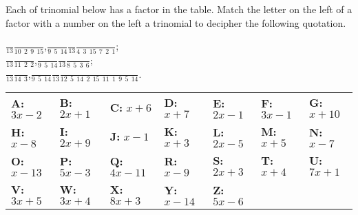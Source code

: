 \begin{exercise}
  Each of trinomial below has a factor in the table. Match the letter on
  the left of a factor with a number on the left a trinomial to
  decipher the following quotation.
  
\vspace*{\baselineskip}

\(\frac{\phantom{A}}{13}\)\quad \(\frac{\phantom{A}}{10~~2~~9~~15}\),\quad \(\frac{\phantom{A}}{9~~5~~14}\)\quad \(\frac{\phantom{A}}{13}\)\quad \(\frac{\phantom{A}}{4~~3~~15~~7~~2~~1}\);\\

\(\frac{\phantom{A}}{13}\)\quad \(\frac{\phantom{A}}{11~~2~~2}\),\quad \(\frac{\phantom{A}}{9~~5~~14}\)\quad \(\frac{\phantom{A}}{13}\)\quad \(\frac{\phantom{A}}{8~~5~~3~~6}\);\\

\(\frac{\phantom{A}}{13}\)\quad \(\frac{\phantom{A}}{14~~3}\),\quad \(\frac{\phantom{A}}{9~~5~~14}\)\quad \(\frac{\phantom{A}}{13}\)\quad \(\frac{\phantom{A}}{12~~5~~14~~2~~15~~11~~1~~9~~5~~14}\).
  
  \begin{longtable}[]{@{}
    >{\raggedright\arraybackslash}p{}
    >{\raggedright\arraybackslash}p{}
    >{\raggedright\arraybackslash}p{}
    >{\raggedright\arraybackslash}p{}
    >{\raggedright\arraybackslash}p{}
    >{\raggedright\arraybackslash}p{}
    >{\raggedright\arraybackslash}p{}@{}}
  \toprule()
  \endhead
  \textbf{A:} \(3x-2\) & \textbf{B:} \(2x+1\) & \textbf{C:} \(x+6\) &
  \textbf{D:} \(x+7\) & \textbf{E:} \(2x-1\) & \textbf{F:} \(3x-1\) &
  \textbf{G:} \(x+10\) \\
  \textbf{H:} \(x-8\) & \textbf{I:} \(2x+9\) & \textbf{J:} \(x-1\) &
  \textbf{K:} \(x+3\) & \textbf{L:} \(2x-5\) & \textbf{M:} \(x+5\) &
  \textbf{N:} \(x-7\) \\
  \textbf{O:} \(x-13\) & \textbf{P:} \(5x-3\) & \textbf{Q:} \(4x-11\) &
  \textbf{R:} \(x-9\) & \textbf{S:} \(2x+3\) & \textbf{T:} \(x+4\) &
  \textbf{U:} \(7x+1\) \\
  \textbf{V:} \(3x+5\) & \textbf{W:} \(3x+4\) & \textbf{X:} \(8x+3\) &
  \textbf{Y:} \(x-14\) & \textbf{Z:} \(5x-6\) & & \\
  \bottomrule()
  \end{longtable}
  

\end{exercise}
